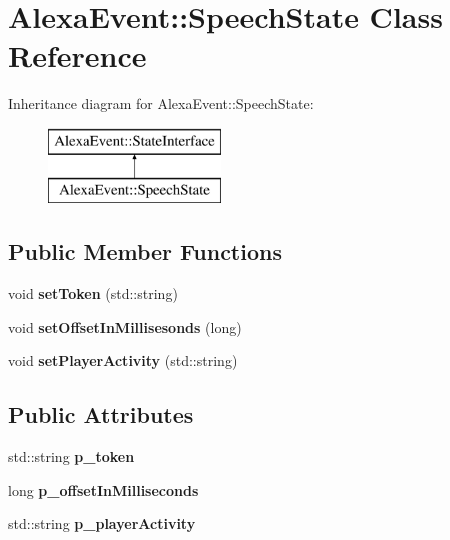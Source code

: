 \hypertarget{classAlexaEvent_1_1SpeechState}{}\section{Alexa\+Event\+:\+:Speech\+State Class Reference}
\label{classAlexaEvent_1_1SpeechState}
Inheritance diagram for Alexa\+Event\+:\+:Speech\+State\+:\begin{figure}[H]
\begin{center}
\leavevmode
\includegraphics[height=2.000000cm]{d6/d5b/classAlexaEvent_1_1SpeechState}
\end{center}
\end{figure}
\subsection*{Public Member Functions}
\begin{DoxyCompactItemize}
\item 
\mbox{\label{classAlexaEvent_1_1SpeechState_acb88617ad8033aa90472cbfee13f3213}} 
void {\bfseries set\+Token} (std\+::string)
\item 
\mbox{\label{classAlexaEvent_1_1SpeechState_a9e707ac559c77024dbff395b3e7653bb}} 
void {\bfseries set\+Offset\+In\+Millisesonds} (long)
\item 
\mbox{\label{classAlexaEvent_1_1SpeechState_a5a83230670f9d35cdd72d524e19991cd}} 
void {\bfseries set\+Player\+Activity} (std\+::string)
\end{DoxyCompactItemize}
\subsection*{Public Attributes}
\begin{DoxyCompactItemize}
\item 
\mbox{\label{classAlexaEvent_1_1SpeechState_ac1163953d3fa7f581b849a4ff2895206}} 
std\+::string {\bfseries p\+\_\+token}
\item 
\mbox{\label{classAlexaEvent_1_1SpeechState_a619e8dbbbe8ddae32a5042047c70b308}} 
long {\bfseries p\+\_\+offset\+In\+Milliseconds}
\item 
\mbox{\label{classAlexaEvent_1_1SpeechState_af845f8d7b20388ec99cdfd0018350978}} 
std\+::string {\bfseries p\+\_\+player\+Activity}
\end{DoxyCompactItemize}
